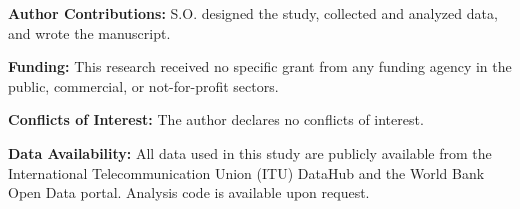 \documentclass[12pt]{article}
\begin{document}
\noindent
\textbf{Author Contributions:} S.O. designed the study, collected and analyzed data, and wrote the manuscript.

\vspace{0.5cm}

\noindent
\textbf{Funding:} This research received no specific grant from any funding agency in the public, commercial, or not-for-profit sectors.

\vspace{0.5cm}

\noindent
\textbf{Conflicts of Interest:} The author declares no conflicts of interest.

\vspace{0.5cm}

\noindent
\textbf{Data Availability:} All data used in this study are publicly available from the International Telecommunication Union (ITU) DataHub and the World Bank Open Data portal. Analysis code is available upon request.
\end{document}
